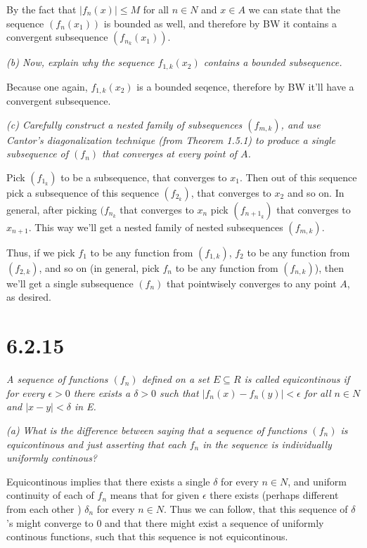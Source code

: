 \documentclass[11pt,oneside,titlepage]{book}
\begin{document}
By the fact that $|f_n(x)| \leq M$ for all $n \in N$ and $x \in A$
we can state that the sequence $(f_n(x_1))$ is bounded as well, and therefore
by BW it contains a convergent subsequence $(f_{n_k}(x_1))$.

\textit{(b) Now, explain why the sequence $f_{1, k}(x_2)$ contains a
  bounded subsequence.}

Because one again, $f_{1, k}(x_2)$ is a bounded seqence, therefore by BW it'll
have a convergent subsequence.

\textit{(c) Carefully construct a nested family of subsequences $(f_{m,k})$,
  and use Cantor's diagonalization technique (from Theorem 1.5.1) to
  produce a single subsequence of $(f_n)$ that converges at every point of
  $A$.}

Pick $(f_{1_k})$ to be a subsequence, that converges
to $x_1$.
Then out of this sequence  pick a subsequence
of this sequence $(f_{2_k})$, that converges to $x_2$
and so on. In general, after picking $(f_{n_k}$ that converges to $x_n$ pick
$(f_{{n + 1}_k})$ that converges to $x_{n + 1}$. This way we'll get a
nested family of nested subsequences $(f_{m, k})$.

Thus, if we pick $f_1$ to be any function from $(f_{1, k})$,
$f_2$ to be any function from $(f_{2, k})$, and so on
(in general, pick  $f_n$ to be any function from $(f_{n, k})$), then we'll
get a single subsequence $(f_n)$ that pointwisely converges to any
point $A$, as desired.

\section*{6.2.15}
\textit{A sequence of functions $(f_n)$ defined on a set $E \subseteq R$ is
  called equicontinous if for every $\epsilon > 0$ there exists a $\delta > 0$
  such that $|f_n(x) - f_n(y)| < \epsilon$ for all $n \in N$ and
  $|x - y| < \delta$ in E.}

\textit{(a) What is the difference between saying that a sequence of
  functions $(f_n)$ is equicontinous and just asserting that each $f_n$ in the
  sequence is individually uniformly continous?}

Equicontinous implies that there exists a single $\delta$ for every $n \in N$,
and uniform continuity of each of $f_n$ means that for given  $\epsilon$
there exists (perhaps different from each other ) $\delta_n$ for
every $n \in N$. Thus we can follow, that  this sequence of $\delta$'s
might converge to 0 and that there might exist a sequence of
uniformly continous functions, such that this sequence is not
equicontinous.
\end{document}
